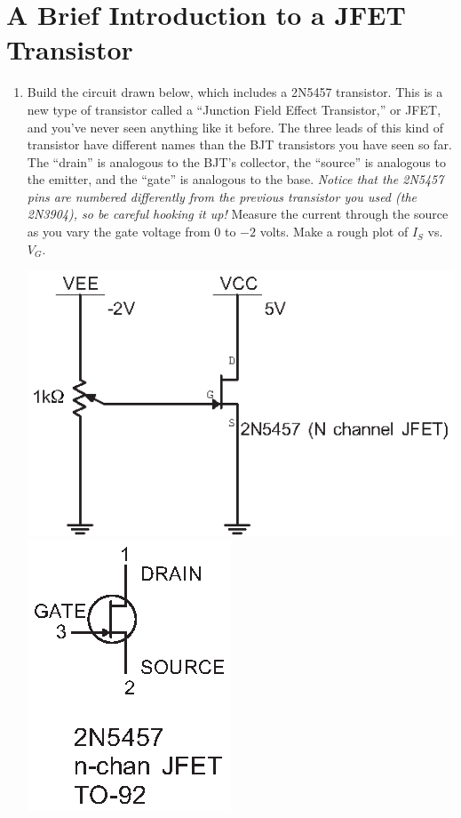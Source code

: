 \section{A Brief Introduction to a JFET Transistor}
\label{lab_jfet}


\bigskip

\begin{enumerate}[wide]

\item Build the circuit drawn below, which includes a 2N5457 transistor.  This is a new type of transistor called a ``Junction Field Effect Transistor,'' or JFET, and you've never seen anything like it before.  The three leads of this kind of transistor have different names than the BJT transistors you have seen so far.  The ``drain'' is analogous to the BJT's collector, the ``source'' is analogous to the emitter, and the ``gate'' is analogous to the base.  \textit{Notice that the 2N5457 pins are numbered differently from the previous transistor you used (the 2N3904), so be careful hooking it up!}  Measure the current through the source as you vary the gate voltage from 0 to $-2$ volts.  Make a rough plot of $I_S$ vs. $V_G$.
\begin{center}
\includegraphics{jfet/JFET_test_circuit.eps}
\includegraphics{appendices/pinouts/2N5457_pinout.eps}

\end{center}
\end{enumerate}
